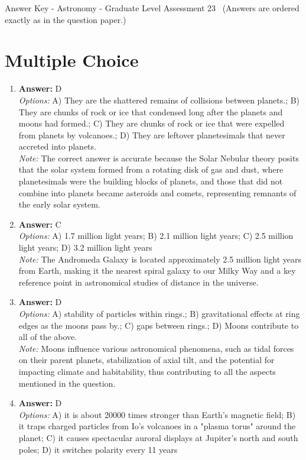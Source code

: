 \documentclass[12pt]{article}
\begin{document}
\begin{center}
Answer Key - Astronomy - Graduate Level Assessment 23 \
\small (Answers are ordered exactly as in the question paper.)
\end{center}

\section*{Multiple Choice}
\begin{enumerate}[label=\arabic*.]
\item \textbf{Answer:} D
\\ \textit{Options:} A) They are the shattered remains of collisions between planets.; B) They are chunks of rock or ice that condensed long after the planets and moons had formed.; C) They are chunks of rock or ice that were expelled from planets by volcanoes.; D) They are leftover planetesimals that never accreted into planets.
\\ \textit{Note:} The correct answer is accurate because the Solar Nebular theory posits that the solar system formed from a rotating disk of gas and dust, where planetesimals were the building blocks of planets, and those that did not combine into planets became asteroids and comets, representing remnants of the early solar system.
\item \textbf{Answer:} C
\\ \textit{Options:} A) 1.7 million light years; B) 2.1 million light years; C) 2.5 million light years; D) 3.2 million light years
\\ \textit{Note:} The Andromeda Galaxy is located approximately 2.5 million light years from Earth, making it the nearest spiral galaxy to our Milky Way and a key reference point in astronomical studies of distance in the universe.
\item \textbf{Answer:} D
\\ \textit{Options:} A) stability of particles within rings.; B) gravitational effects at ring edges as the moons pass by.; C) gaps between rings.; D) Moons contribute to all of the above.
\\ \textit{Note:} Moons influence various astronomical phenomena, such as tidal forces on their parent planets, stabilization of axial tilt, and the potential for impacting climate and habitability, thus contributing to all the aspects mentioned in the question.
\item \textbf{Answer:} D
\\ \textit{Options:} A) it is about 20000 times stronger than Earth's magnetic field; B) it traps charged particles from Io's volcanoes in a "plasma torus" around the planet; C) it causes spectacular auroral displays at Jupiter's north and south poles; D) it switches polarity every 11 years

\end{enumerate}
\end{document}
